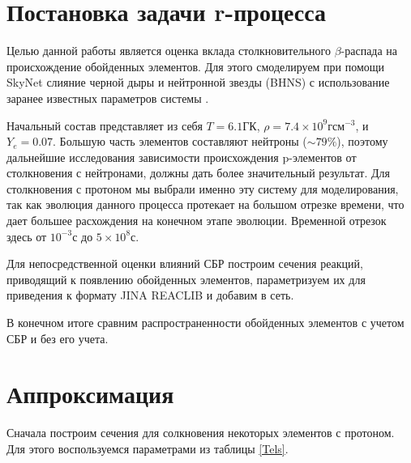 \documentclass[14pt, a4paper]{article}
\begin{document}
\section{Постановка задачи r-процесса}

Целью данной работы является оценка вклада столкновительного $\beta$-распада на происхождение обойденных элементов. Для этого смоделируем при помощи SkyNet слияние черной дыры и нейтронной звезды (BHNS) с использование заранее известных параметров системы \cite{bhns}.

Начальный состав представляет из себя $T = 6.1 \text{ГК}$, $\rho = 7.4 \times 10^9 \text{г} \text{см}^{-3}$, и $Y_e = 0.07$. Большую часть элементов составляют нейтроны ($\sim 79 \%$), поэтому дальнейшие исследования зависимости происхождения p-элементов от столкновения с нейтронами, должны дать более значительный результат. Для столкновения с протоном мы выбрали именно эту систему для моделирования, так как эволюция данного процесса протекает на большом отрезке времени, что дает большее расхождения на конечном этапе эволюции. Временной отрезок здесь от $10^{-3}\text{с}$ до $5\times10^8\text{с}$.

Для непосредственной оценки влияний СБР построим сечения реакций, приводящий к появлению обойденных элементов, параметризуем их для приведения к формату JINA REACLIB и добавим в сеть.

В конечном итоге сравним распространенности обойденных элементов с учетом СБР и без его учета.

\section{Аппроксимация}

Сначала построим сечения для солкновения некоторых элементов с протоном. Для этого воспользуемся параметрами из таблицы \ref{Tels}. 
\end{document}
